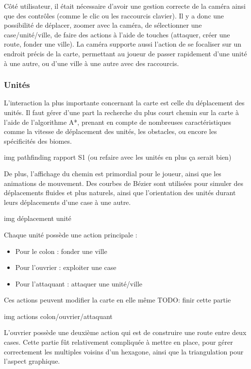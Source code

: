 \documentclass[12pt]{report}
\begin{document}
Côté utilisateur, il était nécessaire d’avoir une gestion correcte de la caméra
ainsi que des contrôles (comme le clic ou les raccourcis clavier). Il y a donc
une possibilité de déplacer, zoomer avec la caméra, de sélectionner une
case/unité/ville, de faire des actions à l’aide de touches (attaquer, créer une
route, fonder une ville). La caméra supporte aussi l’action de se focaliser sur
un endroit précis de la carte, permettant au joueur de passer rapidement d’une
unité à une autre, ou d’une ville à une autre avec des raccourcis.

\subsubsection{Unités}

L’interaction la plus importante concernant la carte est celle du déplacement
des unités. Il faut gérer d’une part la recherche du plus court chemin sur la
carte à l’aide de l’algorithme A*, prenant en compte de nombreuses
caractéristiques comme la vitesse de déplacement des unités, les obstacles, ou
encore les spécificités des biomes.

img pathfinding rapport S1 (ou refaire avec les unités en plus ça serait bien)

De plus, l’affichage du chemin est primordial pour le joueur, ainsi que les
animations de mouvement. Des courbes de Bézier sont utilisées pour simuler des
déplacements fluides et plus naturels, ainsi que l’orientation des unités durant
leurs déplacements d’une case à une autre.

img déplacement unité

Chaque unité possède une action principale :

\begin{itemize} \item Pour le colon : fonder une ville \item Pour l’ouvrier :
exploiter une case \item Pour l’attaquant : attaquer une unité/ville
\end{itemize}

Ces actions peuvent modifier la carte en elle même TODO: finir cette partie

img actions colon/ouvrier/attaquant

L’ouvrier possède une deuxième action qui est de construire une route entre deux
cases. Cette partie fût relativement compliquée à mettre en place, pour gérer
correctement les multiples voisins d’un hexagone, ainsi que la triangulation
pour l’aspect graphique.
\end{document}
